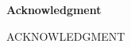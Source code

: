 \thispagestyle{empty}
\begin{center} 
    \vspace{1.0cm}
    \textbf{\LARGE Acknowledgment}
\end{center}

ACKNOWLEDGMENT
